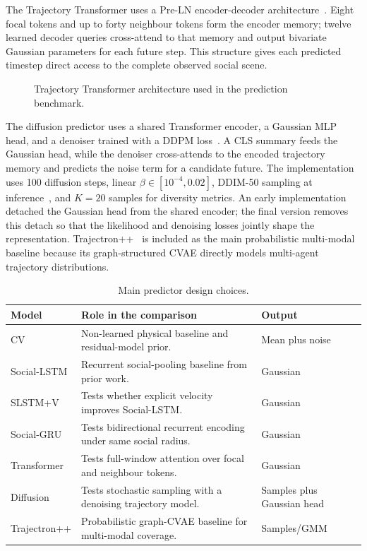 \documentclass[conference]{IEEEtran}
\begin{document}
The Trajectory Transformer uses a Pre-LN encoder-decoder
architecture~\cite{vaswani2017attention,xiong2020layer}. Eight focal tokens and
up to forty neighbour tokens form the encoder memory; twelve learned decoder
queries cross-attend to that memory and output bivariate Gaussian parameters
for each future step. This structure gives each predicted timestep direct
access to the complete observed social scene.

\begin{figure}[t]
  \centering
  \resizebox{0.62\columnwidth}{!}{}
  \caption{Trajectory Transformer architecture used in the prediction benchmark.}
  \label{fig:transformer}
\end{figure}

The diffusion predictor uses a shared Transformer encoder, a Gaussian MLP head,
and a denoiser trained with a DDPM loss~\cite{ho2020denoising}. A CLS summary
feeds the Gaussian head, while the denoiser cross-attends to the encoded
trajectory memory and predicts the noise term for a candidate future. The implementation uses
100 diffusion steps, linear $\beta \in [10^{-4},0.02]$, DDIM-50 sampling at
inference~\cite{song2021denoising}, and $K=20$ samples for diversity metrics.
An early implementation detached the Gaussian head from the shared encoder; the
final version removes this detach so that the likelihood and denoising losses
jointly shape the representation.
Trajectron++~\cite{salzmann2020trajectron} is included as the main probabilistic
multi-modal baseline because its graph-structured CVAE directly models
multi-agent trajectory distributions.

\begin{table}[t]
\caption{Main predictor design choices.}
\label{tab:model_design}
\centering
\scriptsize
\setlength{\tabcolsep}{3pt}
\renewcommand{\arraystretch}{1.12}
\begin{tabularx}{\columnwidth}{@{}p{1.65cm}X p{1.55cm}@{}}
\toprule
\textbf{Model} & \textbf{Role in the comparison} & \textbf{Output} \\
\midrule
CV & Non-learned physical baseline and residual-model prior. & Mean plus noise \\
Social-LSTM & Recurrent social-pooling baseline from prior work. & Gaussian \\
SLSTM+V & Tests whether explicit velocity improves Social-LSTM. & Gaussian \\
Social-GRU & Tests bidirectional recurrent encoding under same social radius. & Gaussian \\
Transformer & Tests full-window attention over focal and neighbour tokens. & Gaussian \\
Diffusion & Tests stochastic sampling with a denoising trajectory model. & Samples plus Gaussian head \\
Trajectron++ & Probabilistic graph-CVAE baseline for multi-modal coverage. & Samples/GMM \\
\bottomrule
\end{tabularx}
\end{table}
\end{document}
